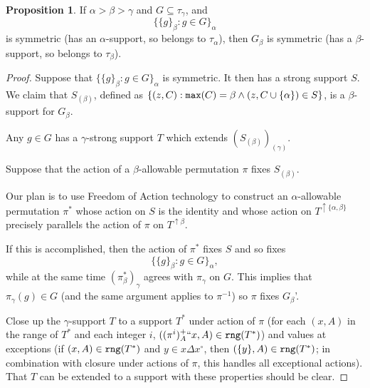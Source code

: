 \documentclass[112pt]{article}
\theoremstyle{definition}
\newtheorem{proposition}[theorem]{Proposition}
\theoremstyle{remark}
\newcommand{\rk}[1]{{\color{blue}\sl #1}}
\begin{document}
\begin{proposition}\label{prop:unions_of_singletons}
If  $\alpha>\beta>\gamma$ and $G \subseteq \tau_\gamma$, and $$\{\{g\}_\beta:g \in G\}_\alpha$$ is symmetric (has an $\alpha$-support, so belongs to $\tau_\alpha$), then $G_\beta$ is symmetric (has a $\beta$-support, so belongs to $\tau_\beta$).
\end{proposition}
\begin{proof}
Suppose that $\{\{g\}_\beta:g \in G\}_\alpha$ is symmetric.  It then has a strong support $S$.  We claim that $S_{(\beta)}$, defined as $\{(z,C): {\tt max}(C)=\beta \wedge (z,C\cup \{\alpha\}) \in S\}$,  is a $\beta$-support for $G_\beta$.

Any $g \in G$ has a $\gamma$-strong support $T$ which extends $(S_{(\beta)})_{(\gamma)}$.

Suppose that the action of a $\beta$-allowable permutation $\pi$ fixes $S_{(\beta)}$.

Our plan is to use Freedom of Action technology to construct an $\alpha$-allowable permutation $\pi^*$ whose action on $S$ is the identity
and whose action on $T^{\uparrow\{\alpha,\beta\}}$ precisely parallels the action of $\pi$ on $T^{\uparrow\beta}$. %

If this is accomplished, then the action of $\pi^*$ fixes $S$ and so fixes $$\{\{g\}_\beta:g \in G\}_\alpha,$$ while at the same
time $(\pi^*_\beta)_\gamma$ agrees with $\pi_\gamma$ on $G$.  This implies that $\pi_\gamma(g) \in G$ (and the same argument applies to $\pi^{-1}$)
so $\pi$ fixes $G_\beta$'.

Close up the $\gamma$-support $T$ to a support $T^*$ under action of $\pi$ (for each $(x,A)$ in the range of $T^*$ and each integer $i$, $((\pi^i)^+_A``x,A) \in {\tt rng}(T^*)$) and values at exceptions
(if $(x,A) \in {\tt rng}(T^*)$ and $y \in x \Delta x^\circ$, then $(\{y\},A) \in {\tt rng}(T^*)$; in combination with closure under actions of $\pi$, this handles all exceptional actions).  That $T$ can be extended to a support with these properties should be clear.


\end{proof}
\end{document}
